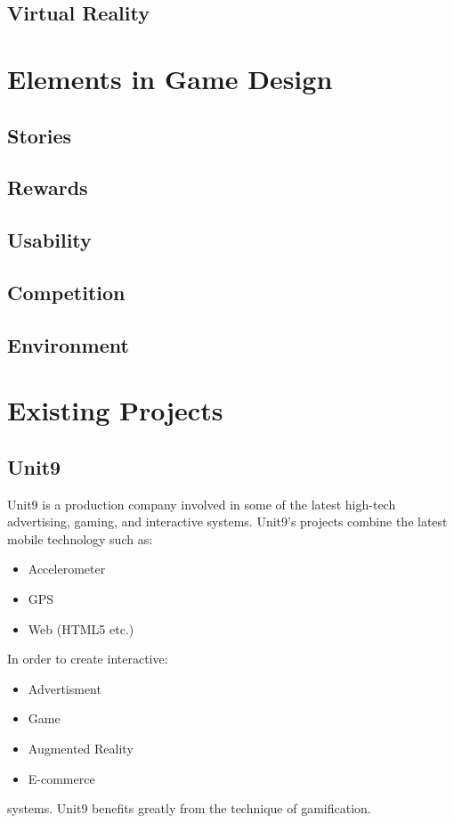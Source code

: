 \documentclass[a4,12pt]{article}
\begin{document}
\subsection{Virtual Reality}
\section{Elements in Game Design}

\subsection{Stories}

\subsection{Rewards}
\subsection{Usability}
\subsection{Competition}
\subsection{Environment}
%
\section{Existing Projects}
%
\subsection{Unit9}
Unit9 is a production company involved in some of the latest high-tech advertising, gaming, and interactive systems. Unit9's projects combine the latest mobile technology such as:
\begin{itemize}
    \item{Accelerometer}
    \item{GPS}
    \item{Web (HTML5 etc.)}
\end{itemize}
In order to create interactive:
\begin{itemize}
    \item{Advertisment}
    \item{Game}
    \item{Augmented Reality}
    \item{E-commerce}
\end{itemize}
systems.
Unit9 benefits greatly from the technique of gamification.
\end{document}
